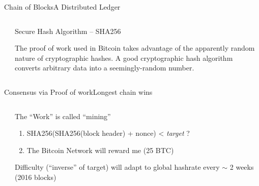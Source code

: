 \documentclass[english,compress]{beamer}
\begin{document}
\begin{frame}{Chain of Blocks}{A Distributed Ledger}
\begin{columns}
 \begin{column}{0.3 \textwidth}
 \end{column}
 \begin{column}{0.6 \textwidth}
 \begin{exampleblock}{\begin{scriptsize}Secure Hash Algorithm -- SHA256\end{scriptsize}}
  \begin{tiny}The proof of work used in Bitcoin takes advantage of the apparently random 
 nature of cryptographic hashes. A good cryptographic
 hash algorithm converts arbitrary data into a seemingly-random number.
 \end{tiny}
 \end{exampleblock}
 \end{column}
 \hfill
\end{columns}
\end{frame}

\begin{frame}{Consensus via Proof of work}{Longest chain wins}
 \begin{columns}
  \begin{column}{0.5 \textwidth}
  \end{column}
  \begin{column}{0.4 \textwidth}
   \begin{exampleblock}{\begin{scriptsize}The ``Work'' is called ``mining'' \end{scriptsize}}
     \begin{scriptsize}
      \begin{enumerate}
       \item SHA256(SHA256(block header) + nonce) < \emph{target} ?
       \item The Bitcoin Network will reward me (25 BTC)
      \end{enumerate}
      Difficulty (``inverse'' of target) will adapt to global hashrate every $\sim$ 2 weeks (2016 blocks)
     \end{scriptsize}
   \end{exampleblock}
  \end{column}
  \hfill
 \end{columns}
\end{frame}
\end{document}

